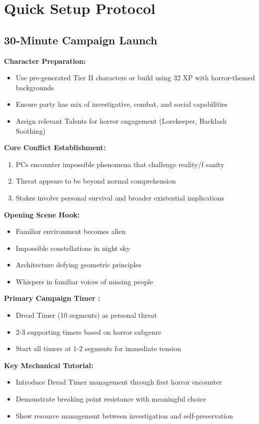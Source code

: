 \documentclass[11pt]{article}
\begin{document}
\section{Quick Setup Protocol}

\subsection{30-Minute Campaign Launch}

\textbf{Character Preparation:}
\begin{itemize}
\item Use pre-generated Tier II characters or build using 32 XP with horror-themed backgrounds
\item Ensure party has mix of investigative, combat, and social capabilities
\item Assign relevant Talents for horror engagement (Lorekeeper, Backlash Soothing)
\end{itemize}

\textbf{Core Conflict Establishment:}
\begin{enumerate}
\item PCs encounter impossible phenomena that challenge reality/f sanity
\item Threat appears to be beyond normal comprehension
\item Stakes involve personal survival and broader existential implications
\end{enumerate}

\textbf{Opening Scene Hook:}
\begin{itemize}
\item Familiar environment becomes alien
\item Impossible constellations in night sky
\item Architecture defying geometric principles
\item Whispers in familiar voices of missing people
\end{itemize}

\textbf{Primary Campaign Timer :}
\begin{itemize}
\item Dread Timer (10 segments) as personal threat
\item 2-3 supporting timers based on horror subgenre
\item Start all timers at 1-2 segments for immediate tension
\end{itemize}

\textbf{Key Mechanical Tutorial:}
\begin{itemize}
\item Introduce Dread Timer management through first horror encounter
\item Demonstrate breaking point resistance with meaningful choice
\item Show resource management between investigation and self-preservation
\end{itemize}
\end{document}
